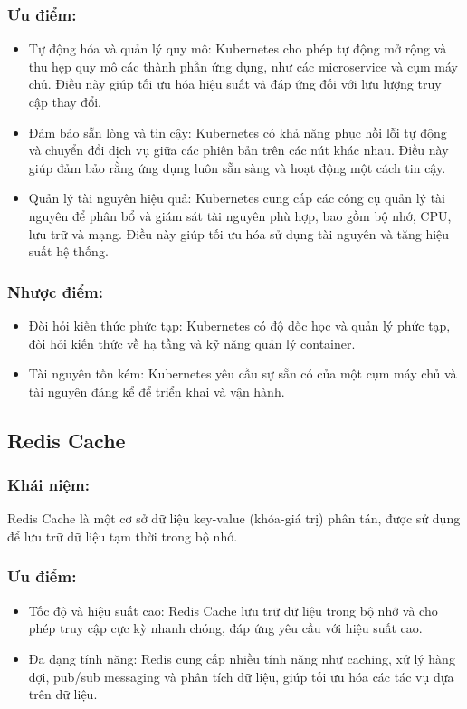 \subsubsection{Ưu điểm:}
\begin{itemize}
    \item Tự động hóa và quản lý quy mô: Kubernetes cho phép tự động mở rộng và thu hẹp quy mô các thành phần ứng dụng, như các microservice và cụm máy chủ. Điều này giúp tối ưu hóa hiệu suất và đáp ứng đối với lưu lượng truy cập thay đổi.

    \item Đảm bảo sẵn lòng và tin cậy: Kubernetes có khả năng phục hồi lỗi tự động và chuyển đổi dịch vụ giữa các phiên bản trên các nút khác nhau. Điều này giúp đảm bảo rằng ứng dụng luôn sẵn sàng và hoạt động một cách tin cậy.

    \item Quản lý tài nguyên hiệu quả: Kubernetes cung cấp các công cụ quản lý tài nguyên để phân bổ và giám sát tài nguyên phù hợp, bao gồm bộ nhớ, CPU, lưu trữ và mạng. Điều này giúp tối ưu hóa sử dụng tài nguyên và tăng hiệu suất hệ thống.

\end{itemize}
\subsubsection{Nhược điểm:}
\begin{itemize}
    \item Đòi hỏi kiến thức phức tạp: Kubernetes có độ dốc học và quản lý phức tạp, đòi hỏi kiến thức về hạ tầng và kỹ năng quản lý container.
    \item Tài nguyên tốn kém: Kubernetes yêu cầu sự sẵn có của một cụm máy chủ và tài nguyên đáng kể để triển khai và vận hành.
\end{itemize}
\subsection{Redis Cache}
\subsubsection{Khái niệm:}
\indent Redis Cache là một cơ sở dữ liệu key-value (khóa-giá trị) phân tán, được sử dụng để lưu trữ dữ liệu tạm thời trong bộ nhớ.
\subsubsection{Ưu điểm:}
\begin{itemize}
    \item Tốc độ và hiệu suất cao: Redis Cache lưu trữ dữ liệu trong bộ nhớ và cho phép truy cập cực kỳ nhanh chóng, đáp ứng yêu cầu với hiệu suất cao.
    \item Đa dạng tính năng: Redis cung cấp nhiều tính năng như caching, xử lý hàng đợi, pub/sub messaging và phân tích dữ liệu, giúp tối ưu hóa các tác vụ dựa trên dữ liệu.
\end{itemize}
